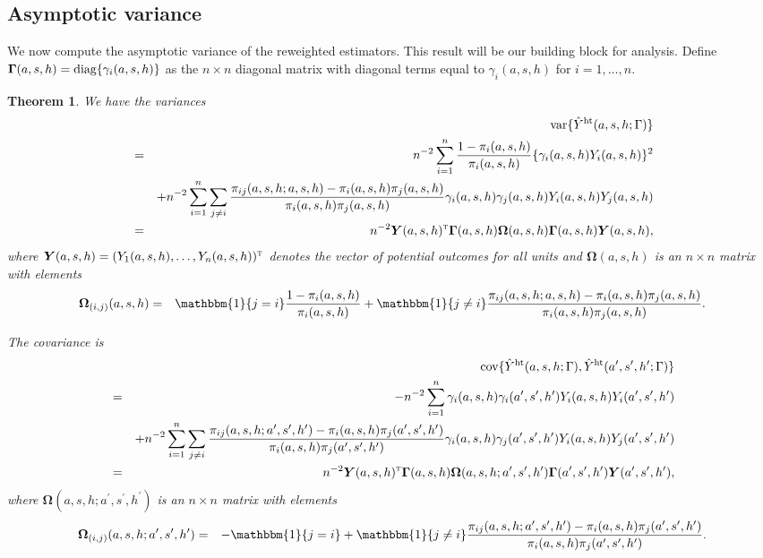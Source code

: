 \documentclass{article}
\newtheorem{theorem}{Theorem}[section]
\def\T{{\textsc{t}}}
\newcommand{\cov}{\textup{cov}}
\newcommand{\var}{\textup{var}}
\newcommand{\bY}{\boldsymbol{Y}}
\newcommand{\bOmega}{\boldsymbol{\Omega}}
\newcommand{\bGamma}{\boldsymbol{\Gamma}}
\newcommand{\sumi}{\sum_{i=1}^n}
\newcommand{\sumjneqi}{\sum_{j\neq i}}
\newcommand{\horthom}{\textup{ht}}
\newcommand{\diag}{\textup{diag}}
\newcommand{\indicator}{\mathbbm{1}}
\newcommand{\ashprime}{a^{\prime},s^{\prime},h^{\prime}}
\newcommand{\pscore}[1]{\pi_{#1}}
\begin{document}
\subsection{Asymptotic variance}
We now compute the asymptotic variance of the reweighted estimators. This result will be our building block for analysis. Define $\bGamma(a,s,h)=\diag\{\gamma_i(a,s,h)\}$ as the $n\times n$ diagonal matrix with diagonal terms equal to $\gamma_i(a,s,h)$ for $i=1,\ldots,n$.
\begin{theorem}
We have the variances
\begin{eqnarray*}
    && \var\{\hat{Y}^{\horthom}(a,s,h;\Gamma)\}\\
    &=& n^{-2}\sumi \frac{1 - \pscore{i}(a, s, h)}{\pscore{i}(a, s, h)}\{\gamma_i(a,s,h)Y_i(a, s, h)\}^2 \\
    &&+ n^{-2}\sumi\sumjneqi\frac{\pscore{ij}(a, s, h; a, s, h) - \pscore{i}(a, s, h)\pscore{j}(a, s, h)}{\pscore{i}(a, s, h)\pscore{j}(a, s, h)}\gamma_i(a,s,h)\gamma_j(a,s,h)Y_i(a, s, h)Y_j(a, s, h) \\
    &=& n^{-2} \bY(a,s,h)^{\T} \bGamma(a,s,h) \bOmega(a,s,h) \bGamma(a,s,h) \bY(a,s,h), 
\end{eqnarray*}
where $\bY(a,s,h)=(Y_1(a,s,h),\ldots,Y_n(a,s,h))^{\T}$ denotes the vector of potential outcomes for all units and $\bOmega(a,s,h)$ is an $n\times n$ matrix with elements
\begin{eqnarray*}
    \bOmega_{(i,j)}(a,s,h) &=& \indicator\{j=i\} \frac{1 - \pscore{i}(a, s, h)}{\pscore{i}(a, s, h)} + \indicator\{j\neq i\}\frac{\pscore{ij}(a, s, h; a, s, h) - \pscore{i}(a, s, h)\pscore{j}(a, s, h)}{\pscore{i}(a, s, h)\pscore{j}(a, s, h)}.
\end{eqnarray*}

The covariance is
\begin{eqnarray*}
    && \cov\{\hat{Y}^{\horthom}(a,s,h;\Gamma), \hat{Y}^{\horthom}(a',s',h';\Gamma)\} \\
    &=& -n^{-2}\sumi  \gamma_i(a,s,h)\gamma_i(\ashprime) Y_i(a, s, h) Y_i(\ashprime) \\ 
    &&+ n^{-2}\sumi\sumjneqi \frac{\pscore{ij}(a, s, h; \ashprime) - \pscore{i}(a, s, h)\pscore{j}(\ashprime)}{\pscore{i}(a, s, h)\pscore{j}(\ashprime)} \gamma_i(a,s,h)\gamma_j(\ashprime)Y_i(a, s, h) Y_j(\ashprime) \\
    &=& n^{-2} \bY(a,s,h)^{\T} \bGamma(a,s,h)\bOmega(a,s,h;\ashprime) \bGamma(a',s',h')\bY(\ashprime),
\end{eqnarray*}
where $\bOmega(a,s,h;\ashprime)$ is an $n\times n$ matrix with elements
\begin{eqnarray*}
    \bOmega_{(i,j)}(a,s,h;\ashprime) &=& -\indicator\{j=i\}+ \indicator\{j\neq i\}\frac{\pscore{ij}(a, s, h; \ashprime) - \pscore{i}(a, s, h)\pscore{j}(\ashprime)}{\pscore{i}(a, s, h)\pscore{j}(\ashprime)}.
\end{eqnarray*}
\end{theorem}
\end{document}
